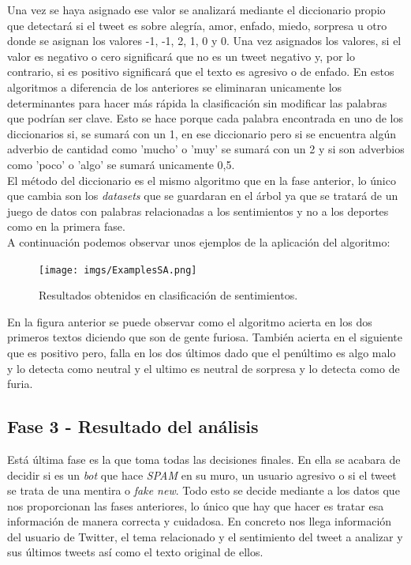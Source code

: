 \documentclass[../all.tex]{subfiles}
\begin{document}
    Una vez se haya asignado ese valor se analizará mediante el diccionario propio que detectará si el tweet es sobre alegría, amor, enfado, miedo, sorpresa u otro donde se asignan los valores -1, -1, 2, 1, 0 y 0. Una vez asignados los valores, si el valor es negativo o cero significará que no es un tweet negativo y, por lo contrario, si es positivo significará que el texto es agresivo o de enfado. En estos algoritmos a diferencia de los anteriores se eliminaran unicamente los determinantes para hacer más rápida la clasificación sin modificar las palabras que podrían ser clave. Esto se hace porque cada palabra encontrada en uno de los diccionarios si, se sumará con un 1, en ese diccionario pero si se encuentra algún adverbio de cantidad como 'mucho' o 'muy' se sumará con un 2 y si son adverbios como 'poco' o 'algo' se sumará unicamente 0,5.\\
    
     El método del diccionario es el mismo algoritmo que en la fase anterior, lo único que cambia son los \textit{datasets} que se guardaran en el árbol ya que se tratará de un juego de datos con palabras relacionadas a los sentimientos y no a los deportes como en la primera fase.\\

    A continuación podemos observar unos ejemplos de la aplicación del algoritmo:\\
    
    \begin{figure}[H]
    	\centering
    	\texttt{[image: imgs/ExamplesSA.png]}
    	\caption{Resultados obtenidos en clasificación de sentimientos.}
    \end{figure}

	En la figura anterior se puede observar como el algoritmo acierta en los dos primeros textos diciendo que son de gente furiosa.  También acierta en el siguiente que es positivo pero, falla en los dos últimos dado que el penúltimo es algo malo y lo detecta como neutral y el ultimo es neutral de sorpresa y lo detecta como de furia.
\newpage
\subsection{Fase 3 - Resultado del análisis}

	Está última fase es la que toma todas las decisiones finales. En ella se acabara de decidir si es un \textit{bot} que hace \textit{SPAM} en su muro, un usuario agresivo o si el tweet se trata de una mentira o \textit{fake new}. Todo esto se decide mediante a los datos que nos proporcionan las fases anteriores, lo único que hay que hacer es tratar esa información de manera correcta y cuidadosa. En concreto nos llega información del usuario de Twitter, el tema relacionado y el sentimiento del tweet a analizar y sus últimos tweets así como el texto original de ellos.\\
	
\end{document}
